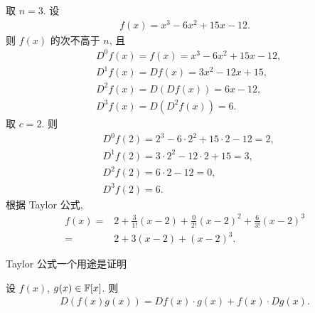 \begin{example}
    取 $n = 3$. 设
    \begin{align*}
        f(x) = x^3 - 6x^2 + 15x - 12.
    \end{align*}
    则 $f(x)$ 的次不高于 $n$, 且
    \begin{align*}
         & D^0 f(x) = f(x) = x^3 - 6x^2 + 15x - 12, \\
         & D^1 f(x) = D f(x) = 3x^2 - 12x + 15,     \\
         & D^2 f(x) = D (D f(x)) = 6x - 12,         \\
         & D^3 f(x) = D (D^2 f(x)) = 6.
    \end{align*}
    取 $c = 2$. 则
    \begin{align*}
         & D^0 f(2) = 2^3 - 6 \cdot 2^2 + 15 \cdot 2 - 12 = 2, \\
         & D^1 f(2) = 3 \cdot 2^2 - 12 \cdot 2 + 15 = 3,       \\
         & D^2 f(2) = 6 \cdot 2 - 12 = 0,                      \\
         & D^3 f(2) = 6.
    \end{align*}
    根据 Taylor 公式,
    \begin{align*}
        f(x)
        = {} & 2 + \frac{3}{1!} (x-2) + \frac{0}{2!} (x-2)^2 + \frac{6}{3!} (x-2)^3 \\
        = {} & 2 + 3(x-2) + (x-2)^3.
    \end{align*}
\end{example}

Taylor 公式一个用途是证明

\begin{proposition}
    设 $f(x)$, $g(x) \in \mathbb{F}[x]$. 则
    \begin{align*}
        D(f(x) g(x)) = Df(x) \cdot g(x) + f(x) \cdot Dg(x). \tag*{(\myStar)}
    \end{align*}
\end{proposition}

